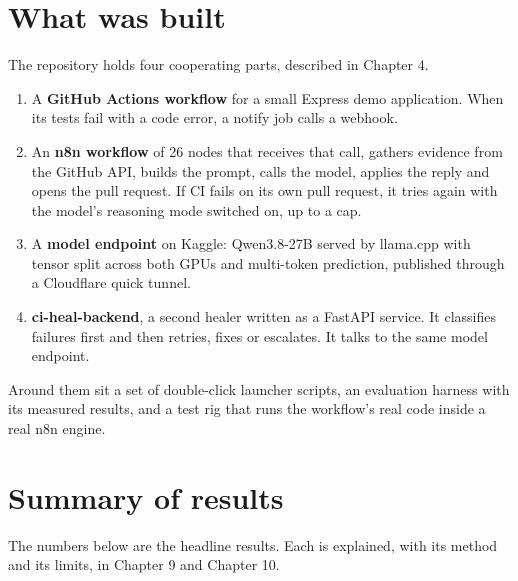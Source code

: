 \documentclass[11pt,a4paper]{report}
\begin{document}
\section{What was built}

The repository holds four cooperating parts, described in Chapter 4.

\begin{enumerate}[leftmargin=*,itemsep=2pt]
\item A \textbf{GitHub Actions workflow} for a small Express demo application. When its tests fail with a code error, a notify job calls a webhook.
\item An \textbf{n8n workflow} of 26 nodes that receives that call, gathers evidence from the GitHub API, builds the prompt, calls the model, applies the reply and opens the pull request. If CI fails on its own pull request, it tries again with the model's reasoning mode switched on, up to a cap.
\item A \textbf{model endpoint} on Kaggle: Qwen3.8-27B served by llama.cpp with tensor split across both GPUs and multi-token prediction, published through a Cloudflare quick tunnel.
\item \textbf{ci-heal-backend}, a second healer written as a FastAPI service. It classifies failures first and then retries, fixes or escalates. It talks to the same model endpoint.
\end{enumerate}

Around them sit a set of double-click launcher scripts, an evaluation harness with its measured results, and a test rig that runs the workflow's real code inside a real n8n engine.

\section{Summary of results}

The numbers below are the headline results. Each is explained, with its method and its limits, in Chapter 9 and Chapter 10.
\end{document}
